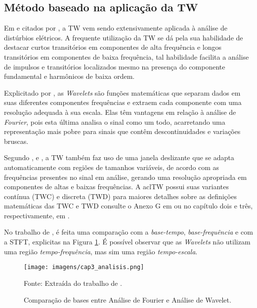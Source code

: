 \subsection{Método baseado na aplicação da \acl{TW}}
\par
Em %
e \cite{IAN09} citados por \cite{FER10}, a \acl{TW} vem sendo extensivamente aplicada à análise de distúrbios elétricos. A frequente utilização da \ac{TW} se dá pela sua habilidade de destacar curtos transitórios em componentes de alta frequência e longos transitórios em componentes de baixa frequência, tal habilidade facilita a análise de impulsos e transitórios localizados mesmo na presença do componente fundamental e harmônicos de baixa ordem. 
\par
Explicitado por \cite{OLI07}, as \emph{Wavelets} são funções matemáticas que separam dados em suas diferentes componentes frequências e extraem cada componente com uma resolução adequada à sua escala. Elas têm vantagens em relação à análise de \textit{Fourier}, pois esta última analisa o sinal como um todo, acarretando uma representação mais pobre para sinais que contêm descontinuidades e variações bruscas.
\par
Segundo \cite{MEN08}, \cite{OLI07} e \cite{FER10}, a \ac{TW} também faz uso de uma janela deslizante que se adapta automaticamente com regiões de tamanhos variáveis, de acordo com as frequências presentes no sinal em análise, gerando uma resolução apropriada em componentes de altas e baixas frequências. A acl{TW} possui suas variantes contínua (TWC) e discreta (TWD) para maiores detalhes sobre as definições matemáticas das TWC e TWD consulte o Anexo G em \cite{FER10} ou no capítulo dois e três, respectivamente, em \citep{OLI07}. 
\par
No trabalho de \cite{MEN08}, é feita uma comparação com a \textit{base-tempo}, \textit{base-frequência} e com a \ac{STFT}, explicitas na Figura \ref{fig:analisis}. É possível observar que as \textit{Wavelets} não utilizam uma região \emph{tempo-frequência}, mas sim uma região \emph{tempo-escala}.
\begin{figure}[!h]
\begin{center}
\caption{Comparação de bases entre Análise de Fourier e Análise de Wavelet.}
\texttt{[image: imagens/cap3\_analisis.png]}
\par{\small Fonte: Extraída do trabalho de \cite{MEN08}.}
\label{fig:analisis}
\end{center}
\end{figure}
